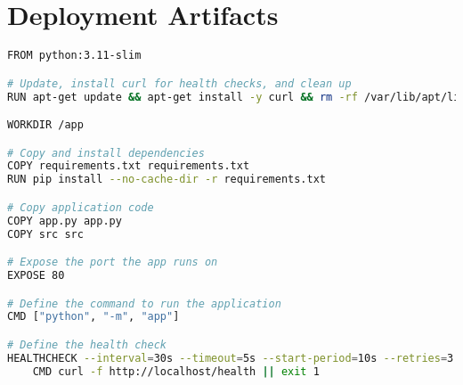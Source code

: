 \chapter{Deployment Artifacts}
\label{app:deployment-artifacts}

\begin{lstlisting}[language=bash, caption={Dockerfile}, label={lst:dockerfile}]
FROM python:3.11-slim

# Update, install curl for health checks, and clean up
RUN apt-get update && apt-get install -y curl && rm -rf /var/lib/apt/lists/*

WORKDIR /app

# Copy and install dependencies
COPY requirements.txt requirements.txt
RUN pip install --no-cache-dir -r requirements.txt

# Copy application code
COPY app.py app.py
COPY src src

# Expose the port the app runs on
EXPOSE 80

# Define the command to run the application
CMD ["python", "-m", "app"]

# Define the health check
HEALTHCHECK --interval=30s --timeout=5s --start-period=10s --retries=3 \
    CMD curl -f http://localhost/health || exit 1
\end{lstlisting}


\lstset{style=jsonstyle}


